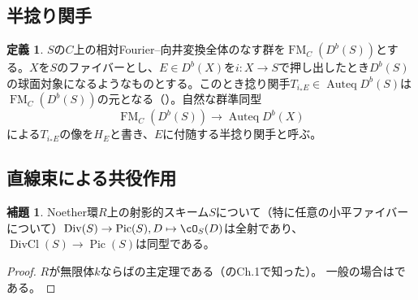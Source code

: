 \documentclass[uplatex, a4paper, dvipdfmx]{jsarticle}
\theoremstyle{definition}
\newtheorem{definition}[theorem]{定義}
\newtheorem{lemma}[theorem]{補題}
\DeclareMathOperator{\Auteq}{\mathrm{Auteq}}
\DeclareMathOperator{\Pic}{\mathrm{Pic}}
\DeclareMathOperator{\FM}{\mathrm{FM}}
\DeclareMathOperator{\Div}{\mathrm{Div}}
\DeclareMathOperator{\DivCl}{\mathrm{DivCl}}
\begin{document}
\subsection{半捻り関手}

\begin{definition}
    $S$の$C$上の相対Fourier--向井変換全体のなす群を$\FM_C(D^b(S))$とする。$X$を$S$のファイバーとし、$E \in D^b(X)$を$i \colon X \to S$で押し出したとき$D^b(S)$の球面対象になるようなものとする。このとき捻り関手$T_{i_*E} \in \Auteq D^b(S)$は$\FM_C(D^b(S))$の元となる（\cite{2023arXiv230212501A}）。自然な群準同型
    \begin{equation}
        \FM_C(D^b(S)) \to \Auteq D^b(X)
    \end{equation}
    による$T_{i_*E}$の像を$H_E$と書き、$E$に付随する半捻り関手と呼ぶ。
\end{definition}
\subsection{直線束による共役作用}
\begin{lemma}\label{lem:cartier-divisor-on-projective-scheme}
    Noether環$R$上の射影的スキーム$S$について（特に任意の小平ファイバーについて）$\Div(S) \to \Pic(S), D \mapsto \cO_S(D)$は全射であり、$\DivCl(S) \to \Pic(S)$は同型である。
\end{lemma}
\begin{proof}
    $R$が無限体$k$ならば\cite{MR0155830}の主定理である（\cite{MR2095471}のCh.1で知った）。
    一般の場合は\cite[Cor.11.28]{MR2675155}である。
\end{proof}
\end{document}
